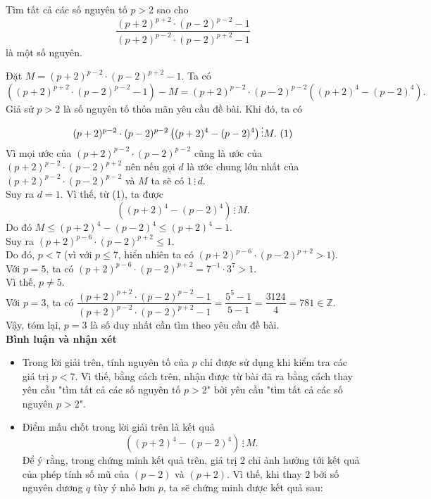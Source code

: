 \begin{bt}%
	Tìm tất cả các số nguyên tố $p>2$ sao cho $$\dfrac{(p+2)^{p+2} \cdot (p-2)^{p-2} - 1}{(p+2)^{p-2} \cdot (p-2)^{p+2}- 1} $$ là một số nguyên. 
	\loigiai
	{
		Đặt $M = (p+2)^{p-2} \cdot (p-2)^{p+2} - 1$. Ta có $$ \left((p+2)^{p+2} \cdot (p-2)^{p-2} - 1 \right) - M = (p+2)^{p-2} \cdot (p-2)^{p-2} \left((p+2)^4 - (p-2)^4 \right).$$ 
		Giả sử $p>2$ là số nguyên tố thỏa mãn yêu cầu đề bài. Khi đó, ta có
		$$(p+2)^{p-2} \cdot (p-2)^{p-2} \left((p+2)^4 - (p-2)^4 \right) \vdots M.  \text{ }\hfill(1)$$
		Vì mọi ước của $(p+2)^{p-2} \cdot (p-2)^{p-2}$ cũng là ước của $(p+2)^{p-2} \cdot (p-2)^{p+2}$ nên nếu gọi $d$ là ước chung lớn nhất của $(p+2)^{p-2} \cdot (p-2)^{p-2}$ và $M$ ta sẽ có $1 \, \vdots \, d$. \\
		Suy ra $d=1$. Vì thế, từ (1), ta được $$\left((p+2)^4 - (p-2)^4 \right) \, \vdots \, M.$$
		Do đó $M \leq (p+2)^4 - (p-2)^4 \leq (p+2)^4 - 1$. \\
		Suy ra $(p+2)^{p-6} \cdot (p-2)^{p+2} \leq 1$.\\
		Do đó, $p<7$ (vì với $p\leq 7$, hiển nhiên ta có $(p+2)^{p-6} \cdot (p-2)^{p+2} > 1$).\\
		Với $p=5$, ta có $(p+2)^{p-6} \cdot (p-2)^{p+2} = 7^{-1} \cdot 3^7 > 1$. \\
		Vì thế, $p \neq 5$.\\
		Với $p=3$, ta có $\dfrac{(p+2)^{p+2} \cdot (p-2)^{p-2} - 1}{(p+2)^{p-2} \cdot (p-2)^{p+2} - 1} = \dfrac{5^5-1}{5-1} = \dfrac{3124}{4} = 781 \in \mathbb{Z}$.\\
		Vậy, tóm lại, $p=3$ là số duy nhất cần tìm theo yêu cầu đề bài.\\
		\textbf{Bình luận và nhận xét}
		\begin{nx}\hfill
			\begin{itemize}
				\item	Trong lời giải trên, tính nguyên tố của $p$ chỉ được sử dụng khi kiểm tra các giá trị $p<7$. Vì thế, bằng cách trên, nhận được từ bài đã ra bằng cách thay yêu cầu "tìm tất cả các số nguyên tố $p>2$" bởi yêu cầu "tìm tất cả các số nguyên $p>2$".
				\item	Điểm mấu chốt trong lời giải trên là kết quả $$ \left((p+2)^4 - (p-2)^4 \right) \, \vdots \, M.$$
				Để ý rằng, trong chứng minh kết quả trên, giá trị $2$ chỉ ảnh hưởng tới kết quả của phép tính số mũ của $(p-2)$ và $(p+2)$. Vì thế, khi thay $2$ bởi số nguyên dương $q$ tùy ý nhỏ hơn $p$, ta sẽ chứng minh được kết quả sau:\\

\end{itemize}
\end{nx}}
\end{bt}
